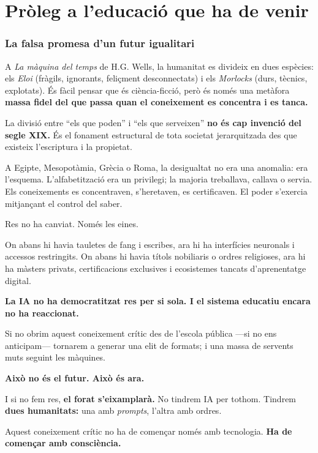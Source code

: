 \documentclass[12pt,a4paper]{article}
\begin{document}
	
	\section*{Pròleg a l'educació que ha de venir}
	
	\subsubsection*{La falsa promesa d’un futur igualitari}
	
	A \textit{La màquina del temps} de H.G. Wells, la humanitat es divideix en dues espècies: els \textit{Eloi} (fràgils, ignorants, feliçment desconnectats) i els \textit{Morlocks} (durs, tècnics, explotats). És fàcil pensar que és ciència-ficció, però és només una metàfora \textbf{massa fidel del que passa quan el coneixement es concentra i es tanca.}
	
	La divisió entre “els que poden” i “els que serveixen” \textbf{no és cap invenció del segle XIX.} És el fonament estructural de tota societat jerarquitzada des que existeix l’escriptura i la propietat.
	
	A Egipte, Mesopotàmia, Grècia o Roma, la desigualtat no era una anomalia: era l’esquema. L’alfabetització era un privilegi; la majoria treballava, callava o servia. Els coneixements es concentraven, s’heretaven, es certificaven. El poder s’exercia mitjançant el control del saber.
	
	Res no ha canviat. Només les eines.
	
	On abans hi havia tauletes de fang i escribes, ara hi ha interfícies neuronals i accessos restringits. On abans hi havia títols nobiliaris o ordres religioses, ara hi ha màsters privats, certificacions exclusives i ecosistemes tancats d’aprenentatge digital.
	
	\textbf{La IA no ha democratitzat res per si sola. I el sistema educatiu encara no ha reaccionat.}
	
	Si no obrim aquest coneixement crític des de l’escola pública —si no ens anticipam— tornarem a generar una elit de formats; i una massa de servents muts seguint les màquines.
	
	\textbf{Això no és el futur. Això és ara.}
	
	I si no fem res, \textbf{el forat s’eixamplarà.}  
	No tindrem IA per tothom. Tindrem \textbf{dues humanitats:} una amb \textit{prompts}, l’altra amb ordres.
	
	Aquest coneixement crític no ha de començar només amb tecnologia. \textbf{Ha de començar amb consciència.}
	
\end{document}

